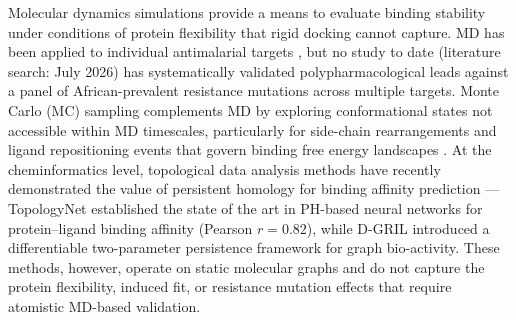 \documentclass[11pt,a4paper]{article}
\begin{document}
Molecular dynamics simulations provide a means to evaluate binding stability under conditions of protein flexibility that rigid docking cannot capture. MD has been applied to individual antimalarial targets \citep{md_antimalarial_2026}, but no study to date (literature search: July 2026) has systematically validated polypharmacological leads against a panel of African-prevalent resistance mutations across multiple targets. Monte Carlo (MC) sampling complements MD by exploring conformational states not accessible within MD timescales, particularly for side-chain rearrangements and ligand repositioning events that govern binding free energy landscapes \citep{mmgbsa_best_practices_2025}. At the cheminformatics level, topological data analysis methods have recently demonstrated the value of persistent homology for binding affinity prediction --- TopologyNet \citep{topologynet_2018} established the state of the art in PH-based neural networks for protein--ligand binding affinity (Pearson $r = 0.82$), while D-GRIL \citep{dgril_2026} introduced a differentiable two-parameter persistence framework for graph bio-activity. These methods, however, operate on static molecular graphs and do not capture the protein flexibility, induced fit, or resistance mutation effects that require atomistic MD-based validation.
\end{document}
